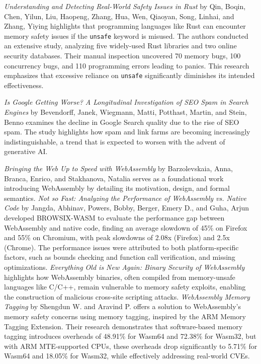 \textit{Understanding and Detecting Real-World Safety Issues in Rust}\cite{10.1145/3385412.3386036} by Qin, Boqin, Chen, Yilun, Liu, Haopeng, Zhang, Hua, Wen, Qiaoyan, Song, Linhai, and Zhang, Yiying highlights that programming languages like Rust can encounter memory safety issues if the \texttt{unsafe} keyword is misused. The authors conducted an extensive study, analyzing five widely-used Rust libraries and two online security databases. Their manual inspection uncovered 70 memory bugs, 100 concurrency bugs, and 110 programming errors leading to panics. This research emphasizes that excessive reliance on \texttt{unsafe} significantly diminishes its intended effectiveness.

\textit{Is Google Getting Worse? A Longitudinal Investigation of SEO Spam in Search Engines}\cite{10.1007/978-3-031-56063-7_4} by Bevendorff, Janek, Wiegmann, Matti, Potthast, Martin, and Stein, Benno examines the decline in Google Search quality due to the rise of SEO spam. The study highlights how spam and link farms are becoming increasingly indistinguishable, a trend that is expected to worsen with the advent of generative AI.

\textit{Bringing the Web Up to Speed with WebAssembly}\cite{10.1145/3062341.3062363} by Barzolevskaia, Anna, Branca, Enrico, and Stakhanova, Natalia serves as a foundational work introducing WebAssembly by detailing its motivation, design, and formal semantics. \textit{Not so Fast: Analyzing the Performance of WebAssembly vs. Native Code} by Jangda, Abhinav, Powers, Bobby, Berger, Emery D., and Guha, Arjun developed BROWSIX-WASM to evaluate the performance gap between WebAssembly and native code, finding an average slowdown of 45\% on Firefox and 55\% on Chromium, with peak slowdowns of 2.08x (Firefox) and 2.5x (Chrome). The performance issues were attributed to both platform-specific factors, such as bounds checking and function call verification, and missing optimizations. \textit{Everything Old is New Again: Binary Security of WebAssembly}\cite{255318} highlights how WebAssembly binaries, often compiled from memory-unsafe languages like C/C++, remain vulnerable to memory safety exploits, enabling the construction of malicious cross-site scripting attacks. \textit{WebAssembly Memory Tagging}\cite{webassemblymemorytagging} by Shengdun W. and Aravind P. offers a solution to WebAssembly's memory safety concerns using memory tagging, inspired by the ARM Memory Tagging Extension. Their research demonstrates that software-based memory tagging introduces overheads of 48.91\% for Wasm64 and 72.38\% for Wasm32, but with ARM MTE-supported CPUs, these overheads drop significantly to 5.71\% for Wasm64 and 18.05\% for Wasm32, while effectively addressing real-world CVEs.